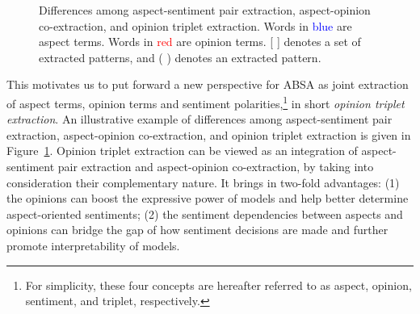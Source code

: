 \documentclass[11pt,a4paper]{article}
\begin{document}
\begin{figure}
    \centering
    \caption{Differences among aspect-sentiment pair extraction, aspect-opinion co-extraction, and opinion triplet extraction. Words in \textcolor{blue}{blue} are aspect terms. Words in \textcolor{red}{red} are opinion terms. [ ] denotes a set of extracted patterns, and ( ) denotes an extracted pattern.}
    \label{fig1}
\end{figure}

This motivates us to put forward a new perspective for ABSA as joint extraction of aspect terms, opinion terms and sentiment polarities,\footnote{For simplicity, these four concepts are hereafter referred to as aspect, opinion, sentiment, and triplet, respectively.} in short \textit{opinion triplet extraction}. An illustrative example of differences among aspect-sentiment pair extraction, aspect-opinion co-extraction, and opinion triplet extraction is given in Figure~\ref{fig1}. Opinion triplet extraction can be viewed as an integration of aspect-sentiment pair extraction and aspect-opinion co-extraction, by taking into consideration their complementary nature. It brings in two-fold advantages: (1) the opinions can boost the expressive power of models and help better determine aspect-oriented sentiments; (2) the sentiment dependencies between aspects and opinions can bridge the gap of how sentiment decisions are made and further promote interpretability of models. 
\end{document}
